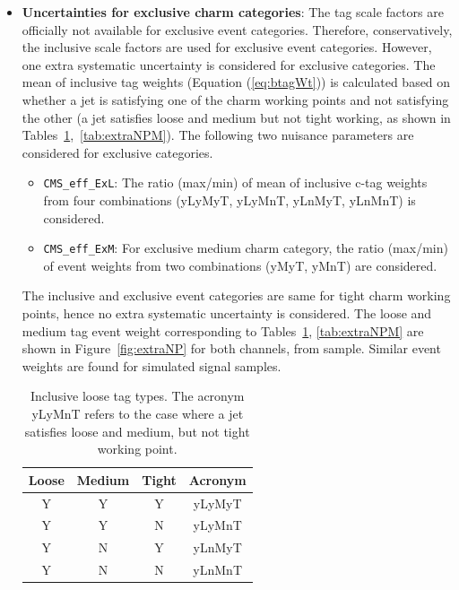 \begin{itemize}[leftmargin=*]
    \item {\bf{Uncertainties for exclusive charm categories}}: The \PQc tag scale factors are
        officially not available for exclusive event categories. Therefore, conservatively, the
        inclusive scale factors are used for exclusive event categories. However, one extra systematic
        uncertainty is considered for exclusive categories. The mean of inclusive \PQc tag weights
        (Equation (\ref{eq:btagWt})) is calculated based on whether a jet is satisfying one of the 
        charm working points and not satisfying the other (\eg a jet satisfies loose and medium but 
        not tight working, as shown in Tables~\ref{tab:extraNPL},~\ref{tab:extraNPM}). The following
	two nuisance parameters are considered for exclusive categories. 
        \begin{itemize}[leftmargin=*]
        \item \verb|CMS_eff_ExL|: The ratio (max/min) of mean of inclusive c-tag weights from four
            combinations (yLyMyT, yLyMnT, yLnMyT, yLnMnT) is considered. 
        \item \verb|CMS_eff_ExM|: For exclusive medium charm category, the ratio (max/min) of
            event weights from two combinations (yMyT, yMnT) are considered. 
        \end{itemize}
    	The inclusive and exclusive event categories are same for tight charm working points, hence no
    	extra systematic uncertainty is considered. The loose and medium \PQc tag event weight 
	corresponding to Tables~\ref{tab:extraNPL}, \ref{tab:extraNPM} are shown in 
	Figure~\ref{fig:extraNP} for both channels, from \ttjets sample. Similar event weights are 
	found for simulated signal samples.
    \begin{table}
    \caption{Inclusive loose \PQc tag types. The acronym yLyMnT refers to the case where a jet
    satisfies loose and medium, but not tight working point.}
    \label{tab:extraNPL}
    \begin{center}
    \begin{tabular}{cccc}
    \hline
    \hline
    {\bf{Loose }} & {\bf{Medium }} & {\bf{Tight }} & {\bf{Acronym}} \\
    \hline
    \hline
    Y     & Y & Y & yLyMyT \\
    Y     & Y & N & yLyMnT \\
    Y     & N & Y & yLnMyT \\
    Y     & N & N & yLnMnT  \\
    \hline
    \end{tabular}
    \end{center}
    \end{table}


\end{itemize}
